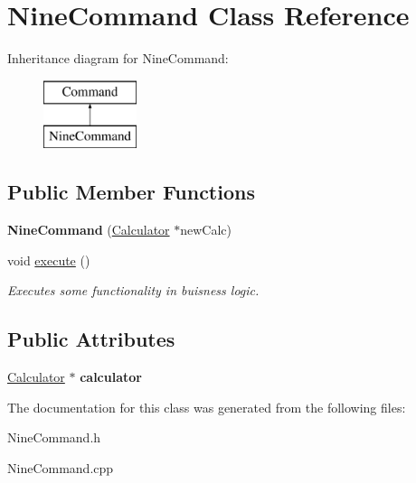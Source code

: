 \hypertarget{class_nine_command}{}\section{Nine\+Command Class Reference}
\label{class_nine_command}
Inheritance diagram for Nine\+Command\+:\begin{figure}[H]
\begin{center}
\leavevmode
\includegraphics[height=2.000000cm]{class_nine_command}
\end{center}
\end{figure}
\subsection*{Public Member Functions}
\begin{DoxyCompactItemize}
\item 
\hypertarget{class_nine_command_a44f89f6ad7fa2a153d4900ae3553bd68}{}{\bfseries Nine\+Command} (\hyperlink{class_calculator}{Calculator} $\ast$new\+Calc)\label{class_nine_command_a44f89f6ad7fa2a153d4900ae3553bd68}

\item 
\hypertarget{class_nine_command_a8574ee5eab651afee7426db0fe2cb2f0}{}void \hyperlink{class_nine_command_a8574ee5eab651afee7426db0fe2cb2f0}{execute} ()\label{class_nine_command_a8574ee5eab651afee7426db0fe2cb2f0}

\begin{DoxyCompactList}\small\item\em Executes some functionality in buisness logic. \end{DoxyCompactList}\end{DoxyCompactItemize}
\subsection*{Public Attributes}
\begin{DoxyCompactItemize}
\item 
\hypertarget{class_nine_command_a3bb8db5764e5c2e3e2025dadf1f81a96}{}\hyperlink{class_calculator}{Calculator} $\ast$ {\bfseries calculator}\label{class_nine_command_a3bb8db5764e5c2e3e2025dadf1f81a96}

\end{DoxyCompactItemize}


The documentation for this class was generated from the following files\+:\begin{DoxyCompactItemize}
\item 
Nine\+Command.\+h\item 
Nine\+Command.\+cpp\end{DoxyCompactItemize}
